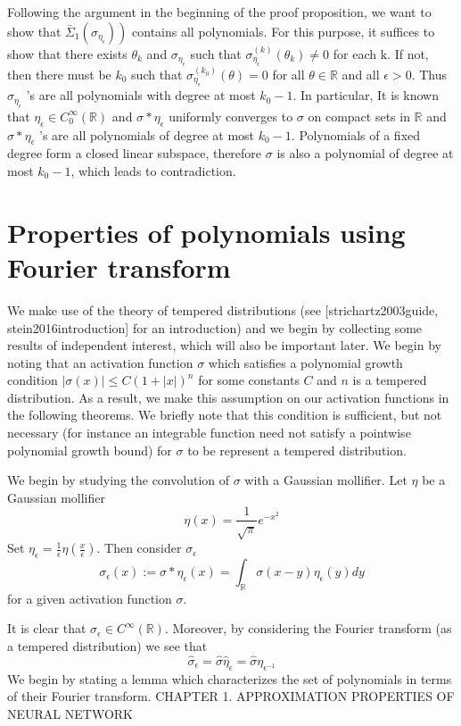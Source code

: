 \documentclass[10pt]{article}
\begin{document}
Following the argument in the beginning of the proof proposition, we want to show that $\left.\bar{\Sigma}_{1}\left(\sigma_{\eta_{\epsilon}}\right)\right)$ contains all polynomials. For this purpose, it suffices to show that there exists $\theta_{k}$ and $\sigma_{\eta_{\epsilon}}$ such that $\sigma_{\eta_{\epsilon}}^{(k)}\left(\theta_{k}\right) \neq 0$ for each $\mathrm{k}$. If not, then there must be $k_{0}$ such that $\sigma_{\eta_{\epsilon}}^{\left(k_{0}\right)}(\theta)=0$ for all $\theta \in \mathbb{R}$ and all $\epsilon>0$. Thus $\sigma_{\eta_{\epsilon}}$ 's are all polynomials with degree at most $k_{0}-1 .$ In particular, It is known that $\eta_{\epsilon} \in C_{0}^{\infty}(\mathbb{R})$ and $\sigma * \eta_{\epsilon}$ uniformly converges to $\sigma$ on compact sets in $\mathbb{R}$ and $\sigma * \eta_{\epsilon}$ 's are all polynomials of degree at most $k_{0}-1 .$ Polynomials of a fixed degree form a closed linear subspace, therefore $\sigma$ is also a polynomial of degree at most $k_{0}-1$, which leads to contradiction.

\section{Properties of polynomials using Fourier transform}
We make use of the theory of tempered distributions (see [strichartz2003guide, stein2016introduction] for an introduction) and we begin by collecting some results of independent interest, which will also be important later. We begin by noting that an activation function $\sigma$ which satisfies a polynomial growth condition $|\sigma(x)| \leq C(1+|x|)^{n}$ for some constants $C$ and $n$ is a tempered distribution. As a result, we make this assumption on our activation functions in the following theorems. We briefly note that this condition is sufficient, but not necessary (for instance an integrable function need not satisfy a pointwise polynomial growth bound) for $\sigma$ to be represent a tempered distribution.

We begin by studying the convolution of $\sigma$ with a Gaussian mollifier. Let $\eta$ be a Gaussian mollifier
$$
\eta(x)=\frac{1}{\sqrt{\pi}} e^{-x^{2}}
$$
Set $\eta_{\epsilon}=\frac{1}{\epsilon} \eta\left(\frac{x}{\epsilon}\right) .$ Then consider $\sigma_{\epsilon}$
$$
\sigma_{\epsilon}(x):=\sigma * \eta_{\epsilon}(x)=\int_{\mathbb{R}} \sigma(x-y) \eta_{\epsilon}(y) d y
$$
for a given activation function $\sigma$.

It is clear that $\sigma_{\epsilon} \in C^{\infty}(\mathbb{R}) .$ Moreover, by considering the Fourier transform (as a tempered distribution) we see that
$$
\hat{\sigma}_{\epsilon}=\hat{\sigma} \hat{\eta}_{\epsilon}=\hat{\sigma} \eta_{\epsilon^{-1}}
$$
We begin by stating a lemma which characterizes the set of polynomials in terms of their Fourier transform. CHAPTER 1. APPROXIMATION PROPERTIES OF NEURAL NETWORK
\end{document}
